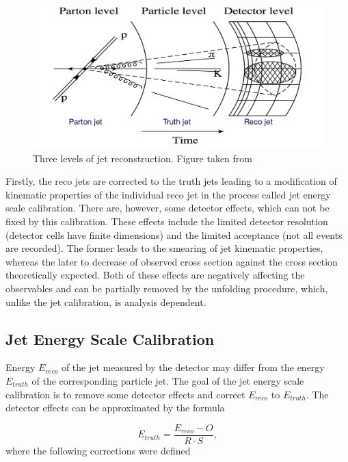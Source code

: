 \begin{figure}[t]
  \centering
  \includegraphics[width=\textwidth]{Chapter2/JetPhases.png}
  \caption[Three levels of jet reconstruction.]
    {Three levels of jet reconstruction. Figure taken from \cite{ZdenekThesis} } 
  \label{fig:JetPhases}
\end{figure}

Firstly, the reco jets are corrected to the truth jets leading to a modification
of kinematic properties of the individual reco jet in the process called jet energy
scale calibration.
There are, however, some detector effects, which can not be
fixed by this calibration. These effects include the limited detector resolution
(detector cells have finite dimensions) and the limited acceptance (not all
events are recorded). The former leads to the smearing of jet kinematic
properties, whereas the later to decrease of observed cross section against the
cross section theoretically expected. Both of these effects are negatively affecting the
observables and can be partially removed by the unfolding procedure, which,
unlike the jet calibration, is analysis dependent.

\subsection{Jet Energy Scale Calibration}

Energy $E_{reco}$ of the jet measured by the detector may differ from the energy
$E_{truth}$ of the corresponding particle jet. The goal of the jet energy scale
calibration is to remove some detector effects and correct $E_{reco}$ to
$E_{truth}$. The detector effects can be approximated by the formula

\begin{equation}
  E_{truth} = \frac{E_{reco} - O}{R \cdot S},
\end{equation}
where the following corrections were defined

